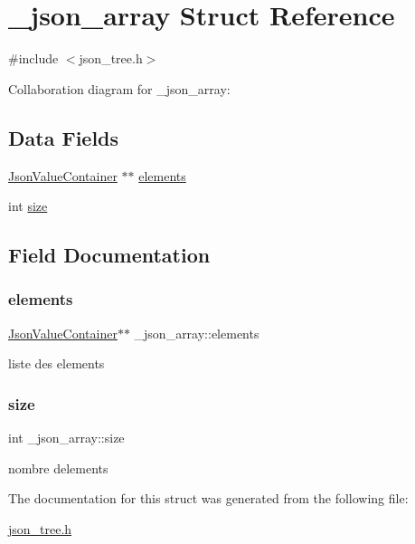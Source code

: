 \hypertarget{struct__json__array}{}\section{\+\_\+json\+\_\+array Struct Reference}
\label{struct__json__array}


{\ttfamily \#include $<$json\+\_\+tree.\+h$>$}



Collaboration diagram for \+\_\+json\+\_\+array\+:
\subsection*{Data Fields}
\begin{DoxyCompactItemize}
\item 
\hyperlink{structJsonValueContainer}{Json\+Value\+Container} $\ast$$\ast$ \hyperlink{struct__json__array_a8ca54d1e67425573f05976a454a07fd5}{elements}
\item 
int \hyperlink{struct__json__array_a94e78470cab37adc7200c745981e917f}{size}
\end{DoxyCompactItemize}


\subsection{Field Documentation}
\mbox{\label{struct__json__array_a8ca54d1e67425573f05976a454a07fd5}} 
\subsubsection{\texorpdfstring{elements}{elements}}
{\footnotesize\ttfamily \hyperlink{structJsonValueContainer}{Json\+Value\+Container}$\ast$$\ast$ \+\_\+json\+\_\+array\+::elements}

liste des elements \mbox{\label{struct__json__array_a94e78470cab37adc7200c745981e917f}} 
\subsubsection{\texorpdfstring{size}{size}}
{\footnotesize\ttfamily int \+\_\+json\+\_\+array\+::size}

nombre d\textquotesingle{}elements 

The documentation for this struct was generated from the following file\+:\begin{DoxyCompactItemize}
\item 
\hyperlink{json__tree_8h}{json\+\_\+tree.\+h}\end{DoxyCompactItemize}
